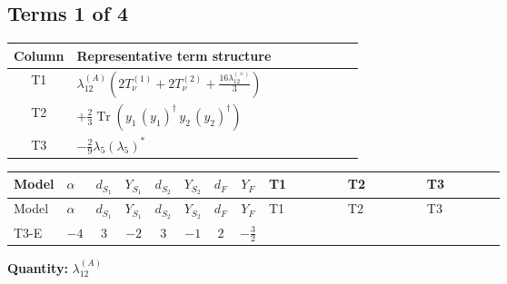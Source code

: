\documentclass[8pt]{article}
\begin{document}
\begin{landscape}
\subsection*{Terms 1 of 4}
\begin{center}
\begin{tabular}{@{}c >{\raggedright\arraybackslash}p{0.82\linewidth}@{}}
\toprule
Column & Representative term structure \\
\midrule
T1 & \(\displaystyle {\lambda_{12}^{(A)}} \left(2 T_{\nu}^{(1)}+2 T_{\nu}^{(2)}+\frac{16 {\lambda_{12}^{(\times)}}}{3}\right)\) \\
\midrule
T2 & \(\displaystyle +\frac{2}{3} \operatorname{Tr}\!\left({y_1}\,\left({y_1}\right)^{\dagger}\,{y_2}\,\left({y_2}\right)^{\dagger}\right)\) \\
\midrule
T3 & \(\displaystyle -\frac{2}{9} {\lambda_5} \left({\lambda_5}\right)^{*}\) \\
\midrule
\bottomrule
\end{tabular}
\end{center}
\smallskip
\tiny
\begin{longtable}{@{}llcccccc >{\raggedright\arraybackslash}p{0.21\linewidth} >{\raggedright\arraybackslash}p{0.21\linewidth} >{\raggedright\arraybackslash}p{0.21\linewidth}@{}}
\toprule
Model & $\alpha$ & $d_{S_1}$ & $Y_{S_1}$ & $d_{S_2}$ & $Y_{S_2}$ & $d_F$ & $Y_F$ & T1 & T2 & T3 \\
\midrule
\endfirsthead
\toprule
Model & $\alpha$ & $d_{S_1}$ & $Y_{S_1}$ & $d_{S_2}$ & $Y_{S_2}$ & $d_F$ & $Y_F$ & T1 & T2 & T3 \\
\midrule
\endhead
T3-E & $-4$ & $3$ & $-2$ & $3$ & $-1$ & $2$ & $-\frac{3}{2}$ & \scriptsize\adjustbox{max width=\linewidth}{$\begin{gathered} {\lambda_{12}^{(A)}} \left(2 T_{\nu}^{(1)}+2 T_{\nu}^{(2)}+\frac{16 {\lambda_{12}^{(\times)}}}{3}\right)\end{gathered}$} & \scriptsize\adjustbox{max width=\linewidth}{$\begin{gathered} +\frac{2}{3} \operatorname{Tr}\!\left({y_1}\,\left({y_1}\right)^{\dagger}\,{y_2}\,\left({y_2}\right)^{\dagger}\right)\end{gathered}$} & \scriptsize\adjustbox{max width=\linewidth}{$\begin{gathered} -\frac{2}{9} {\lambda_5} \left({\lambda_5}\right)^{*}\end{gathered}$} \\
\midrule
\bottomrule
\end{longtable}
\clearpage
\noindent\textbf{Quantity: }$\lambda_{12}^{(A)}$\par\smallskip

\end{landscape}
\end{document}
